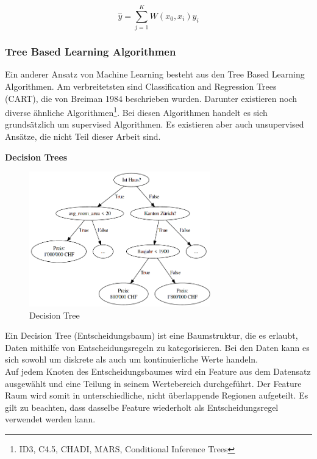 \begin{equation}
\label{eq:knn_with_weights}
\hat{y} = \sum_{j=1}^{K} W(x_0, x_i) y_i
\end{equation}

\subsubsection{Tree Based Learning Algorithmen}
Ein anderer Ansatz von Machine Learning besteht aus den Tree Based Learning Algorithmen. Am verbreitetsten sind Classification and Regression Trees (CART), die von Breiman 1984 beschrieben wurden. Darunter existieren noch diverse ähnliche Algorithmen\footnote{ID3, C4.5, CHADI, MARS, Conditional Inference Trees}. Bei diesen Algorithmen handelt es sich grundsätzlich um supervised Algorithmen. Es existieren aber auch unsupervised Ansätze, die nicht Teil dieser Arbeit sind.

\textbf{Decision Trees}

\begin{figure}[h]\label{fig:decision_tree}
  \centering
  \includegraphics[width=0.7\textwidth]{images/decision_tree.png}
  \caption[Decision Tree]{Decision Tree}
\end{figure}

Ein Decision Tree (Entscheidungsbaum) ist eine Baumstruktur, die es erlaubt, Daten mithilfe von Entscheidungsregeln zu kategorisieren. Bei den Daten kann es sich sowohl um diskrete als auch um kontinuierliche Werte handeln.\\
Auf jedem Knoten des Entscheidungsbaumes wird ein Feature aus dem Datensatz ausgewählt und eine Teilung in seinem Wertebereich durchgeführt. Der Feature Raum wird somit in unterschiedliche, nicht überlappende Regionen aufgeteilt. Es gilt zu beachten, dass dasselbe Feature wiederholt als Entscheidungsregel verwendet werden kann.

